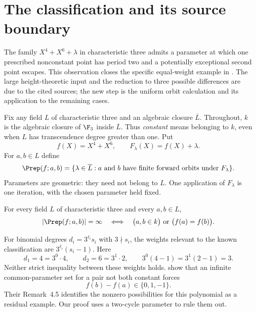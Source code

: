 \section{The classification and its source boundary}\label{sec:result}

The family $X^4+X^6+\lambda$ in characteristic three admits a parameter
at which one prescribed nonconstant point has period two and a
potentially exceptional second point escapes. This observation closes
the specific equal-weight example in \citet[Remark~4.5]{LeeNam2025}.
The large height-theoretic input and the reduction to three possible
differences are due to the cited sources; the new step is the
uniform orbit calculation and its application to the remaining cases.

Fix any field $L$ of characteristic three and an algebraic closure
$\overline L$. Throughout, $k$ is the algebraic closure of $\F_3$
inside $\overline L$. Thus \emph{constant} means belonging to $k$, even
when $L$ has transcendence degree greater than one. Put
\[
 f(X)=X^4+X^6,\qquad F_\lambda(X)=f(X)+\lambda .
\]
For $a,b\in L$ define
\[
 \Prep(f;a,b)=
 \{\lambda\in\overline L:
      a\text{ and }b\text{ have finite forward orbits under }F_\lambda\}.
\]
Parameters are geometric: they need not belong to $L$. One application
of $F_\lambda$ is one iteration, with the chosen parameter held fixed.

\begin{theorem}\label{thm:main}
For every field $L$ of characteristic three and every $a,b\in L$,
\begin{equation}\label{eq:classification}
 |\Prep(f;a,b)|=\infty
 \quad\Longleftrightarrow\quad
 \bigl(a,b\in k\bigr)\ \text{or}\ \bigl(f(a)=f(b)\bigr).
\end{equation}
\end{theorem}

For binomial degrees $d_i=3^{\ell_i}s_i$ with $3\nmid s_i$, the
weights relevant to the known classification are
$3^{\ell_i}(s_i-1)$. Here
\[
 d_1=4=3^0\cdot4,\qquad d_2=6=3^1\cdot2,\qquad
 3^0(4-1)=3^1(2-1)=3.
\]
Neither strict inequality between these weights holds.
\citet[Theorems~1.5 and 4.4]{LeeNam2025} show that an infinite
common-parameter set for a pair not both constant forces
\begin{equation}\label{eq:three}
 f(b)-f(a)\in\{0,1,-1\}.
\end{equation}
Their Remark~4.5 identifies the nonzero possibilities for this
polynomial as a residual example. Our proof uses a two-cycle
parameter to rule them out.

